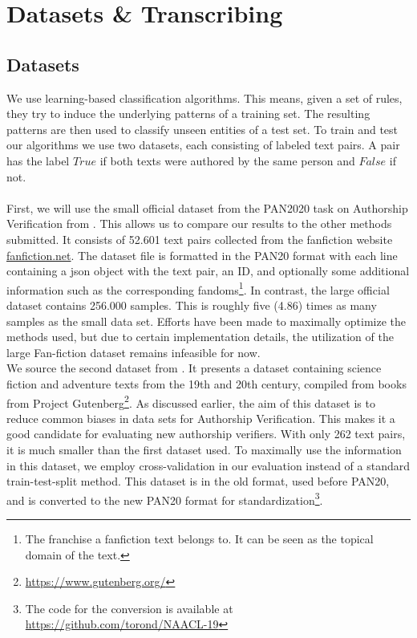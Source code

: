 \chapter{Datasets \& Transcribing}\label{ch:datasets}
\section{Datasets}
We use learning-based classification algorithms.
This means, given a set of rules, they try to induce the underlying patterns of a training set.
The resulting patterns are then used to classify unseen entities of a test set.
To train and test our algorithms we use two datasets, each consisting of labeled text pairs.
A pair has the label $True$ if both texts were authored by the same person and $False$ if not.\\\\
First, we will use the small official dataset from the PAN2020 task on Authorship Verification from \cite{bevendorff2020overview}.
This allows us to compare our results to the other methods submitted.
It consists of 52.601 text pairs collected from the fanfiction website \url{fanfiction.net}.
The dataset file is formatted in the PAN20 format with each line containing a json object with the text pair, an ID, and optionally some additional information such as the corresponding fandoms\footnote{The franchise a fanfiction text belongs to. It can be seen as the topical domain of the text.}.
In contrast, the large official dataset contains 256.000 samples.
This is roughly five (4.86) times as many samples as the small data set.
Efforts have been made to maximally optimize the methods used, but due to certain implementation details, the utilization of the large Fan-fiction dataset remains infeasible for now.\\
We source the second dataset from \cite{stein2019unbiasedGutenbergCorpus}.
It presents a dataset containing science fiction and adventure texts from the 19th and 20th century, compiled from books from Project Gutenberg\footnote{\url{https://www.gutenberg.org/}}.
As discussed earlier, the aim of this dataset is to reduce common biases in data sets for Authorship Verification.
This makes it a good candidate for evaluating new authorship verifiers.
With only 262 text pairs, it is much smaller than the first dataset used.
To maximally use the information in this dataset, we employ cross-validation in our evaluation instead of a standard train-test-split method.
This dataset is in the old format, used before PAN20, and is converted to the new PAN20 format for standardization\footnote{The code for the conversion is available at \url{https://github.com/torond/NAACL-19}}.\\

